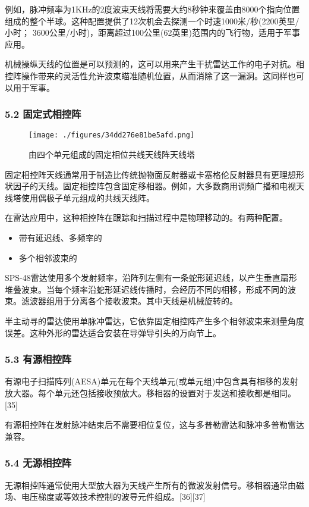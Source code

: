 例如，脉冲频率为1KHz的2度波束天线将需要大约8秒钟来覆盖由8000个指向位置组成的整个半球。这种配置提供了12次机会去探测一个时速1000米/秒(2200英里/小时； 3600公里/小时)，距离超过100公里(62英里)范围内的飞行物，适用于军事应用。

机械操纵天线的位置是可以预测的，这可以用来产生干扰雷达工作的电子对抗。相控阵操作带来的灵活性允许波束瞄准随机位置，从而消除了这一漏洞。这同样也可以用于军事。

\subsubsection{5.2 固定式相控阵}
\begin{figure}[ht]
\centering
\texttt{[image: ./figures/34dd276e81be5afd.png]}
\caption{由四个单元组成的固定相位共线天线阵天线塔} \label{fig_XKZ_12}
\end{figure}
固定相控阵天线通常用于制造比传统抛物面反射器或卡塞格伦反射器具有更理想形状因子的天线。固定相控阵包含固定移相器。例如，大多数商用调频广播和电视天线塔使用偶极子单元组成的共线天线阵。

在雷达应用中，这种相控阵在跟踪和扫描过程中是物理移动的。有两种配置。
\begin{itemize}
\item 带有延迟线、多频率的
\item 多个相邻波束的
\end{itemize}
SPS-48雷达使用多个发射频率，沿阵列左侧有一条蛇形延迟线，以产生垂直扇形堆叠波束。当每个频率沿蛇形延迟线传播时，会经历不同的相移，形成不同的波束。滤波器组用于分离各个接收波束。其中天线是机械旋转的。

半主动寻的雷达使用单脉冲雷达，它依靠固定相控阵产生多个相邻波束来测量角度误差。这种外形的雷达适合安装在导弹导引头的万向节上。

\subsubsection{5.3 有源相控阵}
有源电子扫描阵列(AESA)单元在每个天线单元(或单元组)中包含具有相移的发射放大器。每个单元还包括接收预放大。移相器的设置对于发送和接收都是相同。[35]

有源相控阵在发射脉冲结束后不需要相位复位，这与多普勒雷达和脉冲多普勒雷达兼容。

\subsubsection{5.4 无源相控阵}
无源相控阵通常使用大型放大器为天线产生所有的微波发射信号。移相器通常由磁场、电压梯度或等效技术控制的波导元件组成。[36][37]

